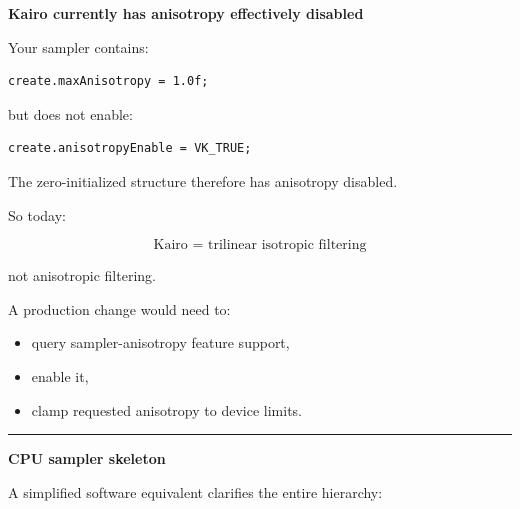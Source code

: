 \textbf{Kairo currently has anisotropy effectively disabled}

Your sampler contains:

\begin{verbatim}
create.maxAnisotropy = 1.0f;
\end{verbatim}

but does not enable:

\begin{verbatim}
create.anisotropyEnable = VK_TRUE;
\end{verbatim}

The zero-initialized structure therefore has anisotropy disabled.

So today:

\[
\boxed{
\text{Kairo = trilinear isotropic filtering}
}
\]

not anisotropic filtering.

A production change would need to:

\begin{itemize}
\tightlist
\item
  query sampler-anisotropy feature support,
\item
  enable it,
\item
  clamp requested anisotropy to device limits.
\end{itemize}

\begin{center}\rule{0.5\linewidth}{0.5pt}\end{center}

\textbf{CPU sampler skeleton}

A simplified software equivalent clarifies the entire hierarchy:

